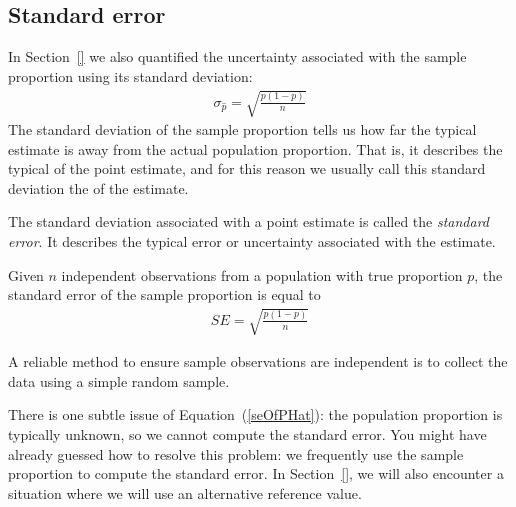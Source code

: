 \subsection{Standard error}
\label{SESection}

In Section~\ref{} we also quantified the uncertainty associated with the sample proportion using its standard deviation:
\begin{align*}
\sigma_{\hat{p}} = \sqrt{\frac{p(1-p)}{n}}
\end{align*}
The standard deviation of the sample proportion tells us how far the typical estimate is away from the actual population proportion. That is, it describes the typical  of the point estimate, and for this reason we usually call this standard deviation the  of the estimate.

\begin{termBox}{
The standard deviation associated with a point estimate is called the \emph{standard error}. It describes the typical error or uncertainty associated with the estimate.}
\end{termBox}

\begin{termBox}{
Given $n$ independent observations from a population with true proportion $p$, the standard error of the sample proportion is equal to \vspace{-1mm}
\begin{eqnarray}
SE = \sqrt{\frac{p(1-p)}{n}}
\label{seOfPHat}
\end{eqnarray}\vspace{-3mm}%

A reliable method to ensure sample observations are independent is to collect the data using a simple random sample.}
\end{termBox}

There is one subtle issue of Equation~(\ref{seOfPHat}): the population proportion is typically unknown, so we cannot compute the standard error. You might have already guessed how to resolve this problem: we frequently use the sample proportion to compute the standard error. In Section~\ref{}, we will also encounter a situation where we will use an alternative reference value.

